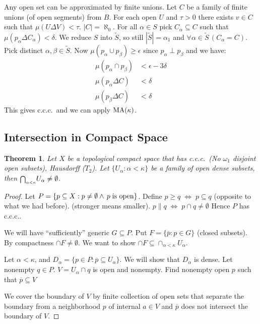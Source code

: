 \documentclass[11pt,pdftex,twoside,a4paper]{article}
\newcommand{\MA}{\ensuremath{\mathop{\rm MA}\nolimits}}
\newcommand{\ccc}{c.c.c.}
\newtheorem{thm}{Theorem}[section]
\theoremstyle{definition}
\begin{document}
Any open set can be approximated by finite unions.
Let $C$ be a family of finite unions (of open segments) from $B$.
For each open $U$ and \(\tau > 0\) there exists \(v\in C\)
such that \(\mu(U \Delta V) < \tau\).
\(|C|=\aleph_0\).
For all \(\alpha\in S\) pick \(C_\alpha\subseteq C\) such that
\(\mu(p_\alpha \Delta C_\alpha) < \delta\).
We reduce $S$ into \(\tilde{S}\), so still \(|\tilde{S}|=\alpha_1\)
and \(\forall \alpha\in\tilde{S}\,(C_\alpha=C)\).
Pick distinct \(\alpha,\beta\in \tilde{S}\).
Now \(\mu(p_\alpha\cup p_\beta) \geq \epsilon\) since \(p_\alpha\perp p_\beta\)
and we have:
\begin{align*}
 \mu(p_\alpha \cap p_\beta) &< \epsilon - 3\delta \\
  \mu(p_\alpha \Delta C) &< \delta \\
  \mu(p_\beta \Delta C) &< \delta
\end{align*}
This gives \ccc\ and we can apply \(\MA(\kappa)\).

\subsection{Intersection in Compact Space}

\begin{thm}
Let $X$ be a topological compact space that has \ccc\
(No \(\omega_1\) disjoint open subsets), Hausdorff (\(T_2\)).
Let \(\{U_\alpha: \alpha < \kappa\}\) be a family
of open dense subsets, then
\(\mathsmaller{\bigcap_{\alpha<\kappa}}U_\alpha \neq \emptyset\).
\end{thm}
\begin{proof}
Let \(P = \{p\subseteq X: p\neq\emptyset \land\,p\;\textnormal{is open}\}\).
Define \(p\geq q \;\iff\; p \subseteq q\) (opposite to what we had before).
(stronger means smaller). %
\(p\| q\;\iff\; p\cap q\neq \emptyset\)
Hence $P$ has \ccc.

We will have ``sufficiently'' generic \(G \subseteq P\).
Put \(F = \{\overline{p}: p\in G\}\) (closed subsets).
By compactness \(\cap F \neq \emptyset\).
We want to show \(\cap F \subseteq \cap_{\alpha<\kappa} U_\alpha\).

Let \(\alpha<\kappa\), and
 \(D_\alpha = \{p\in P: \overline{p}\subseteq U_\alpha\}\).
We will show that \(D_\alpha\) is dense.
Let nonempty \(q\in P\). \(V=U_\alpha \cap q\) is open and nonempty.
Find nonempty open \(p\) such that \(\overline{p} \subseteq V\)

We cover the boundary of $V$ by finite collection of open sets
that separate the boundary from a neighborhood $p$ of internal \(a\in V\)
and \(\overline{p}\) does not intersect the boundary of $V$.
\end{proof}
\end{document}
